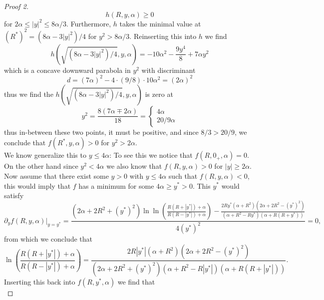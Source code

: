 \documentclass[a4paper,11pt]{article}
\newcommand{\abs}[1]{\left\lvert #1 \right\rvert}
\numberwithin{equation}{section}
\begin{document}
\begin{proof}[Proof 2]
\begin{equation}
	h(R,y,\alpha)\geq0
	\end{equation}
	for $ 2\alpha\leq\abs{y}^2\leq8\alpha/3 $. Furthermore, $ h $ takes the minimal value at $ (R^*)^2=(8\alpha-3\abs{y}^2)/4 $ for $ y^2>8\alpha/3 $. Reinserting this into $ h $ we find \begin{equation}
	h\left(\sqrt{(8\alpha-3\abs{y}^2)/4},y,\alpha\right)=-10 \alpha ^2-\frac{9 y^4}{8}+7 \alpha  y^2
	\end{equation} 
	which is a concave downward parabola in $ y^2 $ with discriminant \begin{equation}
	d=(7\alpha)^2-4\cdot(9/8)\cdot 10\alpha^2=(2\alpha)^2
	\end{equation}
	thus we find the $ h\left(\sqrt{(8\alpha-3\abs{y}^2)/4},y,\alpha\right) $ is zero at \begin{equation}
	y^2=\frac{8(7\alpha\mp 2\alpha)}{18}=\begin{cases}
	4\alpha\\
	20/9\alpha
	\end{cases}
	\end{equation}
	thus in-between these two points, it must be positive, and since $ 8/3>20/9 $, we conclude that $ f(R^*,y,\alpha)>0 $ for $ y^2>2\alpha $. \\ 
	We know generalize this to $ y\leq4\alpha $:
	 To see this we notice that $ f(R,0_+,\alpha)=0 $. On the other hand since $ y^2<4\alpha $ we also know that $ f(R,y,\alpha)>0 $ for $ \abs{y}\geq2\alpha $. Now assume that there exist some $ y>0 $ with $ y\leq4\alpha $ such that $ f(R,y,\alpha)<0 $, this would imply that $ f $ has a minimum for some $ 4\alpha\geq y^*>0 $. This $ y^* $ would satisfy\begin{equation}
	\partial_yf(R,y,\alpha)\rvert_{y=y^*}=\frac{\left(2 \alpha +2 	R^2+(y^*)^2\right) \ln \ln\left(\frac{R(R+\abs{y^*})+\alpha}{R(R-\abs{y^*})+\alpha}\right)-\frac{2 R y^* \left(\alpha +R^2\right) \left(2 \alpha +2
		R^2-(y^*)^2\right)}{\left(\alpha +R^2-R y^*\right) (\alpha +R (R+y^*))}}{4 (y^*)^2}=0,
	\end{equation}
	from which we conclude that \begin{equation}
	\ln\left(\frac{R(R+\abs{y^*})+\alpha}{R(R-\abs{y^*})+\alpha}\right)=\frac{2 R \abs{y^*} \left(\alpha +R^2\right) \left(2 \alpha +2
		R^2-(y^*)^2\right)}{\left(2 \alpha +2 	R^2+(y^*)^2\right)\left(\alpha +R^2-R \abs{y^*}\right) (\alpha +R (R+\abs{y^*}))}.
	\end{equation}
	Inserting this back into $ f(R,y^*,\alpha) $ we find that \begin{equation}

\end{equation}
\end{proof}
\end{document}
